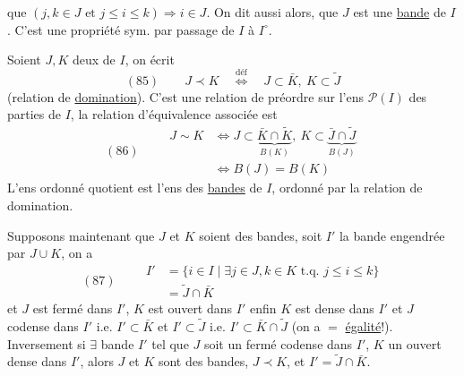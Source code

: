 
que  $(j,k\in J\text{ et }j\leq i\leq k)\Longrightarrow i\in J$. On dit aussi alors, que $J$ est une \uline{bande} de $I$. C'est  une propriété sym. par passage de $I$ à $I^\circ$.

Soient $J,K$ deux   de $I$, on écrit
\[
(85)\qquad J\prec K\quad\overset{\mathrm{déf}}{\Longleftrightarrow}\quad J\subset\bar K,\ K\subset\widetilde J
\]
(relation de \uline{domination}). C'est une relation de préordre sur l'ens $\mathcal P(I)$ des parties de $I$, la relation d'équivalence associée est
\[
(86)\qquad\begin{aligned}
J\sim K&\Longleftrightarrow J\subset\underbrace{\bar K\cap\widetilde K}_{B(K)},\ K\subset\underbrace{\bar J\cap\widetilde J}_{B(J)}\\
&\Longleftrightarrow B(J)=B(K)
\end{aligned}
\]
L'ens ordonné quotient est l'ens des \uline{bandes} de $I$, ordonné par la relation de  domination.

Supposons maintenant que $J$ et $K$ soient des bandes,  soit $I'$ la bande engendrée par $J\cup K$, on a
\[
(87)\qquad\begin{aligned}
I'&=\{i\in I\mid\exists j\in J,k\in K\text{ t.q. }j\leq i\leq k\}\\
&=\widetilde J\cap\bar K
\end{aligned}
\]
et $J$ est fermé dans $I'$, $K$ est ouvert dans $I'$ enfin  $K$ est dense dans $I'$ et $J$ codense dans $I'$ i.e. $I'\subset\bar K$ et $I'\subset\widetilde J$  i.e. $I'\subset\bar K\cap\widetilde J$ (on a $=$ \uline{égalité}!). Inversement si $\exists$ bande $I'$ tel que $J$ soit un fermé codense dans $I'$, $K$ un ouvert dense dans $I'$, alors $J$ et $K$ sont des bandes, $J\prec K$, et  $I'=\widetilde J\cap\bar K$.
